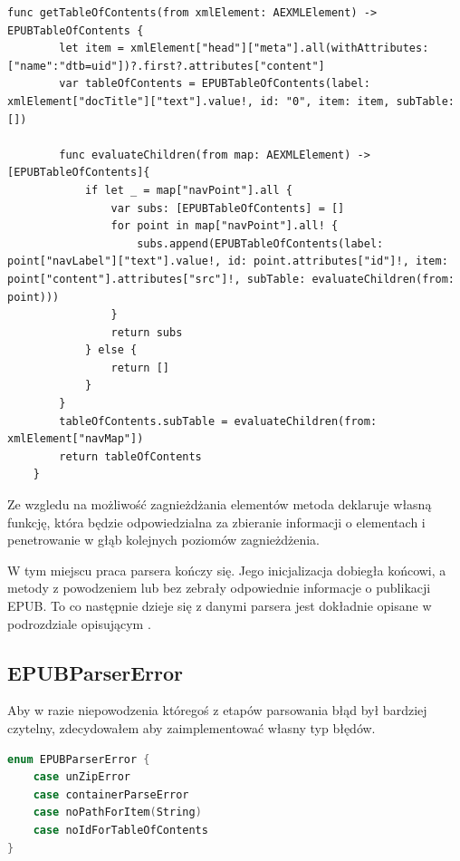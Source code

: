 \begin{lstlisting}[caption={Implementacja metody getTableOfContents(from xmlElement:).},language=swift-reference]
    func getTableOfContents(from xmlElement: AEXMLElement) -> EPUBTableOfContents {
        let item = xmlElement["head"]["meta"].all(withAttributes: ["name":"dtb=uid"])?.first?.attributes["content"]
        var tableOfContents = EPUBTableOfContents(label: xmlElement["docTitle"]["text"].value!, id: "0", item: item, subTable: [])

        func evaluateChildren(from map: AEXMLElement) -> [EPUBTableOfContents]{
            if let _ = map["navPoint"].all {
                var subs: [EPUBTableOfContents] = []
                for point in map["navPoint"].all! {
                    subs.append(EPUBTableOfContents(label: point["navLabel"]["text"].value!, id: point.attributes["id"]!, item: point["content"].attributes["src"]!, subTable: evaluateChildren(from: point)))
                }
                return subs
            } else {
                return []
            }
        }
        tableOfContents.subTable = evaluateChildren(from: xmlElement["navMap"])
        return tableOfContents
    }
\end{lstlisting}

Ze wzgledu na możliwość zagnieżdżania elementów metoda deklaruje własną funkcję, która będzie odpowiedzialna za zbieranie informacji o elementach i penetrowanie w głąb kolejnych poziomów zagnieżdżenia.

W tym miejscu praca parsera kończy się. Jego inicjalizacja dobiegła końcowi, a metody z powodzeniem lub bez zebrały odpowiednie informacje o publikacji EPUB. To co następnie dzieje się z danymi parsera jest dokładnie opisane w podrozdziale opisującym .

\subsection{EPUBParserError}

Aby w razie niepowodzenia któregoś z etapów parsowania błąd był bardziej czytelny, zdecydowałem aby zaimplementować własny typ błędów.

\begin{lstlisting}[caption={Enumeracja EPUBParserError.},language=swift]
enum EPUBParserError {
    case unZipError
    case containerParseError
    case noPathForItem(String)
    case noIdForTableOfContents
}
\end{lstlisting}

